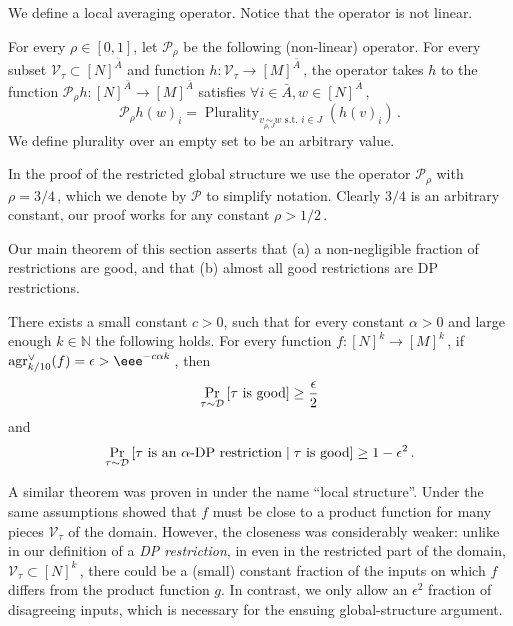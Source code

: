 \documentclass{toc}
\newcommand{\Prob}[2][]{\Pr_{{#1}}\left[#2\right]} %
\newcommand\f{f} %
\newcommand{\g}{g} %
\newcommand\h{h} %
\newcommand{\test}[2]{
	\ifx &#2&
	\textrm{agr}^{#1}
	\else	
	\textrm{agr}^{#1}_{#2}
	\fi}
\newcommand\cons{\mathcal{V}} %
\newcommand\cor[1]{\underset{\scriptscriptstyle#1}{\sim}} %
\DeclareMathOperator*\plur{\mathrm{Plurality}} %
\newcommand\rest[1]{{\bar{#1}}}  %
\begin{document}
We define a local averaging operator.
Notice that the operator is not linear.
\begin{definition} \label{def:local average}
	For every $\rho\in[0,1]$, let $\mathcal{P}_\rho$ be the following (non-linear) operator. For every subset $\cons_\tau\subset[N]^\rest{A}$ and function $\h:\cons_\tau\rightarrow[M]^{\bar{A}}$\,, the operator takes $h$ to the function $\mathcal{P}_\rho h:[N]^{\bar{A}}\rightarrow[M]^{\bar{A}}$ satisfies $ \forall i\in\bar{A},w\in[N]^{\bar{A}}$\,,
	\[  \mathcal{P}_\rho \h(w)_i = \plur_{v\cor{\rho,J}{w}\text{ s.t. } i\in J}(\h(v)_i)\,.\] %
	We define plurality over an empty set to be an arbitrary value.
\end{definition}
In the proof of the restricted global structure we use the operator $\mathcal{P}_\rho$ with $\rho = 
%
3/4$\,, %
which we denote by $\mathcal{P}$ to simplify notation. Clearly 
%
$3/4$ %
 is an arbitrary constant, our proof works for any constant $\rho>
%
1/2$\,. %

Our main theorem of this section asserts that (a) a non-negligible fraction of restrictions are good, and that (b) almost all good restrictions are DP restrictions.
\begin{theorem}\label{thm:local} 
	There exists a small constant $c>0$, such that 
	for every constant $\alpha>0$ and large enough $k\in\mathbb{N}$ the following holds.
	For every function  $\f:[N]^k\rightarrow[M]^k$\,, if $\test{\vee}{k/10}(\f)=\epsilon > \eee^{-c\alpha k}$\,, then 
	\[ \Prob[\tau\sim\mathcal{D}]{\tau \hbox{ is good}} \ge \frac{\epsilon}{2}
	\] and \[ \Prob[\tau\sim\mathcal{D}]{\tau \hbox{ is an $\alpha$-DP restriction} \;|\; \tau\hbox{ is good}} \ge 1-{\epsilon}^{2}\,.\] %
\end{theorem}


A similar theorem was proven in \cite{dinur2014direct} under the name ``local structure''. Under the same assumptions \cite{dinur2014direct} showed that $f$ must be close to a product function for many pieces $\cons_\tau$ of the domain. However, the closeness was considerably weaker: unlike in our definition of a \emph{DP restriction}, in \cite{dinur2014direct} even in the restricted part of the domain, $\cons_\tau\subset [N]^k$\,, there could be a (small) constant fraction of the inputs on which $f$ differs from the product function $\g$. In contrast, we only allow an $\epsilon^2$ fraction of disagreeing inputs, which is necessary for the ensuing global-structure argument.
\end{document}
